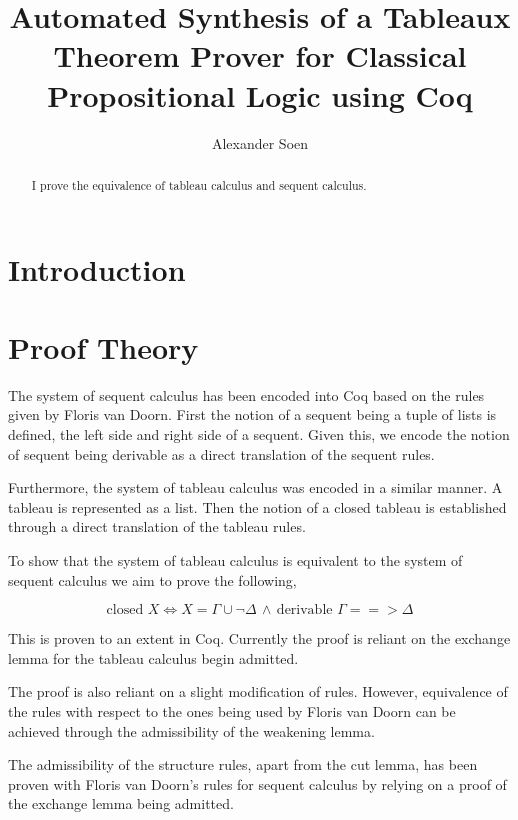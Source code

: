 \documentclass{report}
\title{Automated Synthesis of a Tableaux Theorem Prover for Classical
Propositional Logic using Coq}
\author{Alexander Soen}
\begin{document}
\begin{abstract}
I prove the equivalence of tableau calculus and sequent calculus.
\end{abstract}

\section{Introduction}

\section{Proof Theory}

The system of sequent calculus has been encoded into Coq based on the rules
given by Floris van Doorn. First the notion of a sequent being a tuple of lists
is defined, the left side and right side of a sequent. Given this, we encode
the notion of sequent being derivable as a direct translation of the sequent
rules.

\par

Furthermore, the system of tableau calculus was encoded in a similar manner.
A tableau is represented as a list. Then the notion of a closed tableau is
established through a direct translation of the tableau rules.

\par

To show that the system of tableau calculus is equivalent to the system of
sequent calculus we aim to prove the following,

\begin{equation}
\text{closed }X \iff X=\Gamma \cup \neg \Delta \, \wedge \, \text{derivable }
\Gamma ==> \Delta
\label{tableau sequent equivalence}
\end{equation}

This is proven to an extent in Coq. Currently the proof is reliant on the
exchange lemma for the tableau calculus begin admitted.

\par

The proof is also reliant on a slight modification of rules. However,
equivalence of the rules with respect to the ones being used by Floris van
Doorn can be achieved through the admissibility of the weakening lemma.

\par

The admissibility of the structure rules, apart from the cut lemma, has been
proven with Floris van Doorn's rules for sequent calculus by relying on a
proof of the exchange lemma being admitted.
\end{document}
